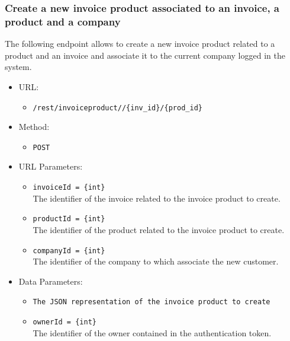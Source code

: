 \subsubsection*{Create a new invoice product associated to an invoice, a product and a company}

The following endpoint allows to create a new invoice product related to a product and an invoice and associate it to the current company logged in the system.

\begin{itemize}
    
    \item URL: 
    \begin{itemize}
        \item \texttt{/rest/invoiceproduct//\{inv\_id\}/\{prod\_id\}}
    \end{itemize}
    
    \item Method: 
    \begin{itemize}
        \item \texttt{POST}
    \end{itemize}
    
    \item URL Parameters: 
    \begin{itemize}
	\item \texttt{invoiceId = \{int\}} \\
        The identifier of the invoice related to the invoice product to create.
	\item \texttt{productId = \{int\}} \\
        The identifier of the product related to the invoice product to create.
        \item \texttt{companyId = \{int\}} \\
        The identifier of the company to which associate the new customer.
    \end{itemize}
    
    \item Data Parameters: 
    \begin{itemize}
        \item \texttt{The JSON representation of the invoice product to create} 
        \item \texttt{ownerId = \{int\}} \\
        The identifier of the owner contained in the authentication token.
    \end{itemize}
    

\end{itemize}
